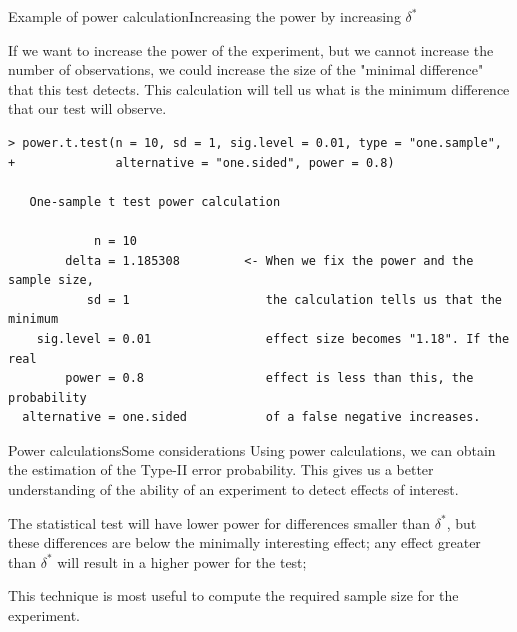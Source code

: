 \begin{frame}[fragile]{Example of power calculation}{Increasing the power by increasing $\delta^*$}

If we want to increase the power of the experiment, but we cannot increase the
number of observations, we could increase the size of the "minimal difference"
that this test detects. This calculation will tell us what is the minimum difference
that our test will observe.

{\smaller
\begin{verbatim}
> power.t.test(n = 10, sd = 1, sig.level = 0.01, type = "one.sample",
+              alternative = "one.sided", power = 0.8)

   One-sample t test power calculation

            n = 10
        delta = 1.185308         <- When we fix the power and the sample size,
           sd = 1                   the calculation tells us that the minimum
    sig.level = 0.01                effect size becomes "1.18". If the real
        power = 0.8                 effect is less than this, the probability
  alternative = one.sided           of a false negative increases.
\end{verbatim}}
\end{frame}

%
%
%
%
%

\begin{frame}{Power calculations}{Some considerations}
  Using power calculations, we can obtain the estimation of the Type-II error probability. This gives us a better understanding of the ability of an experiment
  to detect effects of interest.\bigskip

  The statistical test will have lower power for differences smaller than $\delta^*$, but these differences are below the minimally interesting effect; any effect greater than $\delta^*$ will result in a higher power for the test;\bigskip

  This technique is most useful to compute the required sample size for the   experiment.
\end{frame}



